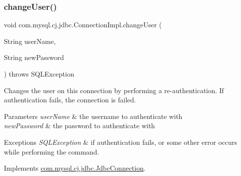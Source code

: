 \mbox{\label{classcom_1_1mysql_1_1cj_1_1jdbc_1_1_connection_impl_a124604d3aae705d3e14bc1deb6a3f9a9}} 
\subsubsection{\texorpdfstring{change\+User()}{changeUser()}}
{\footnotesize\ttfamily void com.\+mysql.\+cj.\+jdbc.\+Connection\+Impl.\+change\+User (\begin{DoxyParamCaption}\item[{String}]{user\+Name,  }\item[{String}]{new\+Password }\end{DoxyParamCaption}) throws S\+Q\+L\+Exception}

Changes the user on this connection by performing a re-\/authentication. If authentication fails, the connection is failed.


\begin{DoxyParams}{Parameters}
{\em user\+Name} & the username to authenticate with \\
\hline
{\em new\+Password} & the password to authenticate with \\
\hline
\end{DoxyParams}

\begin{DoxyExceptions}{Exceptions}
{\em S\+Q\+L\+Exception} & if authentication fails, or some other error occurs while performing the command. \\
\hline
\end{DoxyExceptions}


Implements \mbox{\hyperlink{interfacecom_1_1mysql_1_1cj_1_1jdbc_1_1_jdbc_connection_aed0496e0f2c1236f2784f92b45a482ef}{com.\+mysql.\+cj.\+jdbc.\+Jdbc\+Connection}}.

\mbox{\label{classcom_1_1mysql_1_1cj_1_1jdbc_1_1_connection_impl_a33d9303b2ac912fc285f5c2215d568d1}} 
